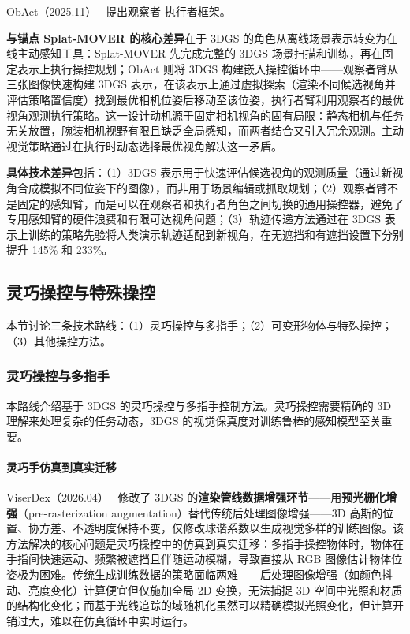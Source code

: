 ObAct（2025.11）~\cite{2511_18140} 提出观察者-执行者框架。

\textbf{与锚点 Splat-MOVER 的核心差异}在于 3DGS 的角色从离线场景表示转变为在线主动感知工具：Splat-MOVER 先完成完整的 3DGS 场景扫描和训练，再在固定表示上执行操控规划；ObAct 则将 3DGS 构建嵌入操控循环中——观察者臂从三张图像快速构建 3DGS 表示，在该表示上通过虚拟探索（渲染不同候选视角并评估策略置信度）找到最优相机位姿后移动至该位姿，执行者臂利用观察者的最优视角观测执行策略。这一设计动机源于固定相机视角的固有局限：静态相机与任务无关放置，腕装相机视野有限且缺乏全局感知，而两者结合又引入冗余观测。主动视觉策略通过在执行时动态选择最优视角解决这一矛盾。

\textbf{具体技术差异}包括：（1）3DGS 表示用于快速评估候选视角的观测质量（通过新视角合成模拟不同位姿下的图像），而非用于场景编辑或抓取规划；（2）观察者臂不是固定的感知臂，而是可以在观察者和执行者角色之间切换的通用操控器，避免了专用感知臂的硬件浪费和有限可达视角问题；（3）轨迹传递方法通过在 3DGS 表示上训练的策略先验将人类演示轨迹适配到新视角，在无遮挡和有遮挡设置下分别提升 145\% 和 233\%。

\subsection{灵巧操控与特殊操控}
\label{ss:17_2b}

本节讨论三条技术路线：（1）灵巧操控与多指手；（2）可变形物体与特殊操控；（3）其他操控方法。

\subsubsection{灵巧操控与多指手}

本路线介绍基于 3DGS 的灵巧操控与多指手控制方法。灵巧操控需要精确的 3D 理解来处理复杂的任务动态，3DGS 的视觉保真度对训练鲁棒的感知模型至关重要。

\paragraph{灵巧手仿真到真实迁移}

ViserDex（2026.04）~\cite{2604_11138} 修改了 3DGS 的\textbf{渲染管线数据增强环节}——用\textbf{预光栅化增强}（pre-rasterization augmentation）替代传统后处理图像增强——3D 高斯的位置、协方差、不透明度保持不变，仅修改球谐系数以生成视觉多样的训练图像。该方法解决的核心问题是灵巧操控中的仿真到真实迁移：多指手操控物体时，物体在手指间快速运动、频繁被遮挡且伴随运动模糊，导致直接从 RGB 图像估计物体位姿极为困难。传统生成训练数据的策略面临两难——后处理图像增强（如颜色抖动、亮度变化）计算便宜但仅施加全局 2D 变换，无法捕捉 3D 空间中光照和材质的结构化变化；而基于光线追踪的域随机化虽然可以精确模拟光照变化，但计算开销过大，难以在仿真循环中实时运行。

